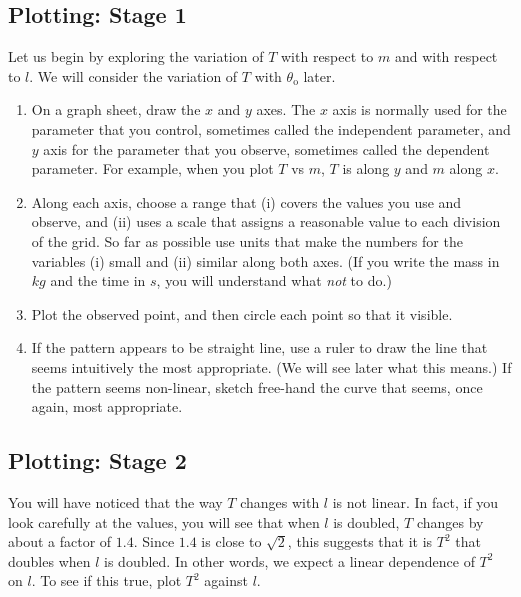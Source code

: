 \subsection{Plotting: Stage 1}
Let us begin by exploring the variation of $T$ with respect to $m$ and with respect to $l$. We will consider the variation of $T$ with $\theta_\text{o}$ later. 
\vspace{-0.5cm}
\begin{enumerate}
\itemsep0em
    \item On a graph sheet, draw the $x$ and $y$ axes. The $x$ axis is normally used for the parameter that you control, sometimes called the independent parameter, and $y$ axis for the parameter that you observe, sometimes called the dependent parameter. For example, when you plot $T$ vs $m$, $T$ is along $y$ and $m$ along $x$. 
    
    \item Along each axis, choose a range that (i) covers the values you use and observe, and (ii) uses a scale that assigns a reasonable value to each division of the grid. So far as possible use units that make the numbers for the variables (i) small and (ii) similar along both axes. (If you write the mass in $kg$ and the time in $s$, you will understand what \textit{not} to do.) 
    
    \item Plot the observed point, and then circle each point so that it visible. 
    
    \item If the pattern appears to be straight line, use a ruler to draw the line that seems intuitively the most appropriate. (We will see later what this means.) If the pattern seems non-linear, sketch free-hand the curve that seems, once again, most appropriate.
    
\end{enumerate}

\subsection{Plotting: Stage 2}

You will have noticed that the way $T$ changes with $l$ is not linear. In fact, if you look carefully at the values, you will see that when $l$ is doubled, $T$ changes by about a factor of $1.4$. Since $1.4$ is close to $\sqrt{2}$, this suggests that it is $T^2$ that doubles when $l$ is doubled. In other words, we expect a linear dependence of $T^2$ on $l$. To see if this true, plot $T^2$ against $l$.

